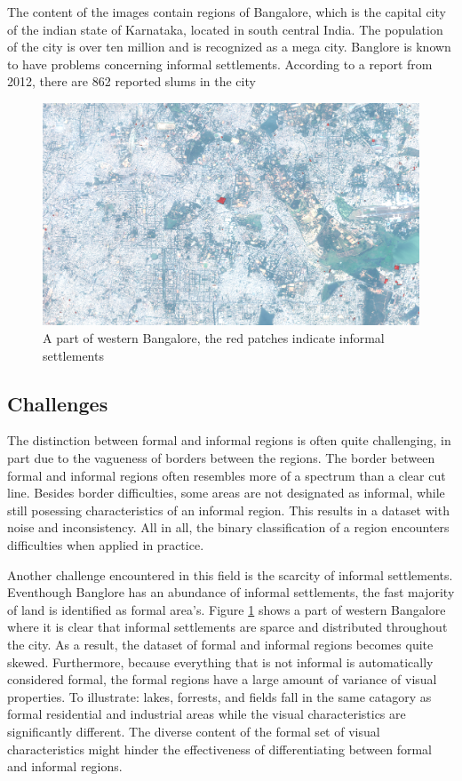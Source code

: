 The content of the images contain regions of Bangalore, which is the capital
city of the indian state of Karnataka, located in south central India. The
population of the city is over ten million and is recognized as a mega city.
Banglore is known to have problems concerning informal settlements. According
to a report from 2012, there are 862 reported slums in the city


\begin{figure}
  \includegraphics[width=\linewidth]{images/west-bangalore}
  \caption{A part of western Bangalore, the red patches indicate informal
  settlements}
  \label{fig:west-bangalore}
\end{figure}

\subsection{Challenges}
The distinction between formal and informal regions is often quite challenging,
in part due to the vagueness of borders between the regions. The border between
formal and informal regions often resembles more of a spectrum than a clear cut line.
Besides border difficulties, some areas are not designated as informal, while
still posessing characteristics of an informal region. This results in
a dataset with noise and inconsistency.  All in all, the binary classification
of a region encounters difficulties when applied in practice. 


Another challenge encountered in this field is the scarcity of informal
settlements.  Eventhough Banglore  has an abundance of informal settlements,
the fast majority of land is identified as formal area's. Figure
\ref{fig:west-bangalore} shows a part of western Bangalore where it is clear
that informal settlements are sparce and distributed throughout the city. As
a result, the dataset of formal and informal regions becomes quite skewed.
Furthermore, because everything that is not informal is automatically
considered formal, the formal regions have a large amount of variance of visual
properties.  To illustrate: lakes, forrests, and fields fall in the same
catagory as formal residential and industrial areas while the visual
characteristics are significantly different. The diverse content of the formal
set of visual characteristics might hinder the effectiveness of differentiating
between formal and informal regions. 

